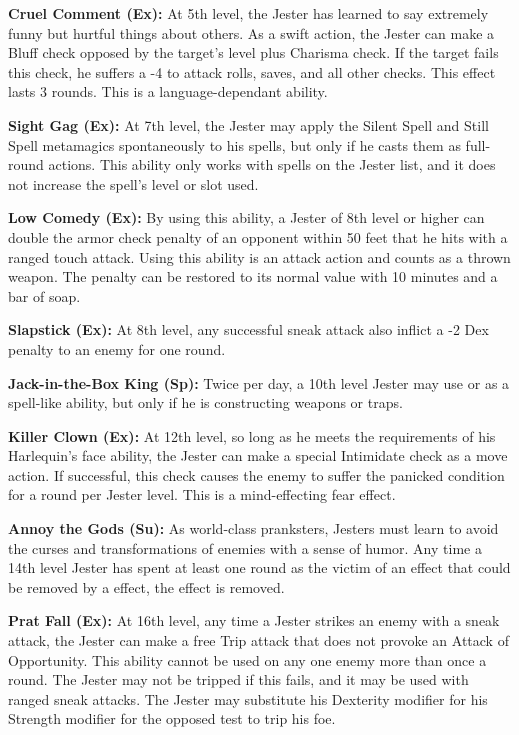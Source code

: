 \textbf{Cruel Comment (Ex):} At 5th level, the Jester has learned to say extremely funny but hurtful things about others. As a swift action, the Jester can make a Bluff check opposed by the target's level plus Charisma check. If the target fails this check, he suffers a -4 to attack rolls, saves, and all other checks. This effect lasts 3 rounds. This is a language-dependant ability.

\textbf{Sight Gag (Ex):} At 7th level, the Jester may apply the Silent Spell and Still Spell metamagics spontaneously to his spells, but only if he casts them as full-round actions. This ability only works with spells on the Jester list, and it does not increase the spell's level or slot used.

\textbf{Low Comedy (Ex):} By using this ability, a Jester of 8th level or higher can double the armor check penalty of an opponent within 50 feet that he hits with a ranged touch attack. Using this ability is an attack action and counts as a thrown weapon. The penalty can be restored to its normal value with 10 minutes and a bar of soap.

\textbf{Slapstick (Ex):} At 8th level, any successful sneak attack also inflict a -2 Dex penalty to an enemy for one round.

\textbf{Jack-in-the-Box King (Sp):} Twice per day, a 10th level Jester may use  or  as a spell-like ability, but only if he is constructing weapons or traps.

\textbf{Killer Clown (Ex):} At 12th level, so long as he meets the requirements of his Harlequin's face ability, the Jester can make a special Intimidate check as a move action. If successful, this check causes the enemy to suffer the panicked condition for a round per Jester level. This is a mind-effecting fear effect.

\textbf{Annoy the Gods (Su):} As world-class pranksters, Jesters must learn to avoid the curses and transformations of enemies with a sense of humor. Any time a 14th level Jester has spent at least one round as the victim of an effect that could be removed by a  effect, the effect is removed.

\textbf{Prat Fall (Ex):} At 16th level, any time a Jester strikes an enemy with a sneak attack, the Jester can make a free Trip attack that does not provoke an Attack of Opportunity. This ability cannot be used on any one enemy more than once a round. The Jester may not be tripped if this fails, and it may be used with ranged sneak attacks. The Jester may substitute his Dexterity modifier for his Strength modifier for the opposed test to trip his foe.

